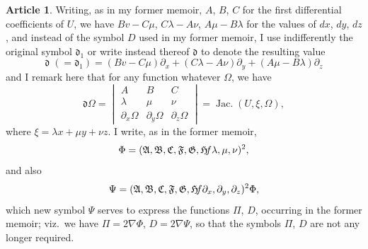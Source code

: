 \documentclass[12pt,a4paper]{article}
\theoremstyle{definition}
\newtheorem{art}{Article}[section]
\DeclareMathOperator{\Jac}{Jac.}
\begin{document}
\begin{art}
Writing, as in my former memoir, $A$, $B$, $C$ for the first differential coefficients of $U$, we have $Bv - C\mu$, $C\lambda - A\nu$, $A\mu - B\lambda$ for the values of $dx$, $dy$, $dz$, and instead of the symbol $D$ used in my former memoir, I use indifferently the original symbol $\mathfrak{d}_1$ or write instead thereof $\mathfrak{d}$ to denote the resulting value
\[
\mathfrak{d} \;(= \mathfrak{d}_1) = (Bv - C\mu)\partial_x + (C\lambda - A\nu)\partial_y + (A\mu - B\lambda)\partial_z
\]
and I remark here that for any function whatever $\Omega$, we have
\[
\mathfrak{d}\Omega = \begin{vmatrix} A & B & C \\ \lambda & \mu & \nu \\ \partial_x\Omega & \partial_y\Omega & \partial_z\Omega \end{vmatrix} = \Jac(U, \xi, \Omega),
\]
where $\xi = \lambda x + \mu y + \nu z$. I write, as in the former memoir,
\[
\Phi = (\mathfrak{A}, \mathfrak{B}, \mathfrak{C}, \mathfrak{F}, \mathfrak{G}, \mathfrak{H} \hspace{-2pt} f\lambda, \mu, \nu)^2,
\]
and also
\[
\Psi = (\mathfrak{A}, \mathfrak{B}, \mathfrak{C}, \mathfrak{F}, \mathfrak{G}, \mathfrak{H} \hspace{-2pt} f\partial_x, \partial_y, \partial_z)^2 \Phi,
\]
which new symbol $\Psi$ serves to express the functions $\Pi$, $D$, occurring in the former memoir; viz.\ we have $\Pi = 2\nabla\Phi$, $D = 2\nabla\Psi$, so that the symbols $\Pi$, $D$ are not any longer required.
\end{art}
\end{document}
